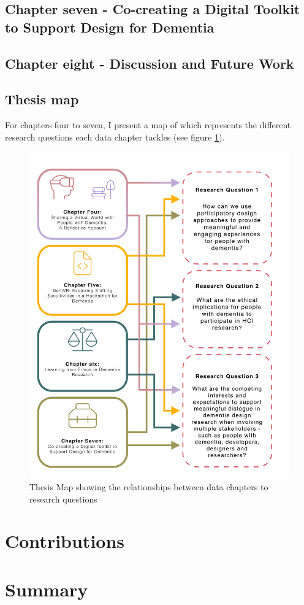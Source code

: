 \subsection{Chapter seven - Co-creating a Digital Toolkit to Support Design for Dementia}
\label{Intro:ChapterSeven}

\subsection{Chapter eight - Discussion and Future Work}
\label{Intro:ChapterEight}


\subsection{Thesis map}
For chapters four to seven, I present a map of which represents the different research questions each data chapter tackles (see figure \ref{fig:RQ_and_Chapters}).

\label{Intro:Thesis Map}
\begin{figure}[htp]
\centering
\includegraphics[width=.8\linewidth]{Images/Thesis_Narrative/RQ_and_Chapters.png}
\caption{Thesis Map showing the relationships between data chapters to research questions}
\label{fig:RQ_and_Chapters}
\end{figure}


\section{Contributions}
\label{Intro:Contribution}

\section{Summary}
\label{Intro: Summary}